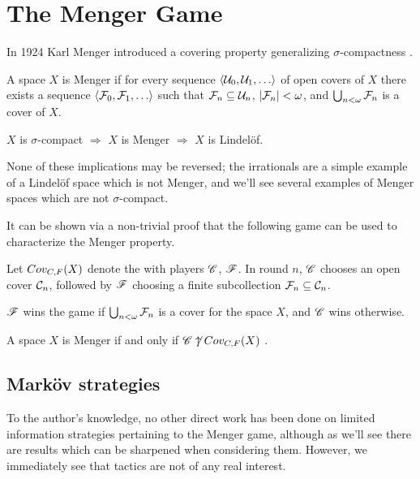 
\chapter{The Menger Game}

In 1924 Karl Menger introduced a covering property generalizing
$\sigma$-compactness \cite{custom31879423}.

\begin{defn}
  A space $X$ is Menger if for every sequence $\<\mc U_0,\mc U_1,\dots\>$
  of open covers of $X$ there exists a sequence
  $\<\mc F_0,\mc F_1,\dots\>$ such that $\mathcal{F}_n\subseteq \mathcal{U}_n$,
  $|\mathcal{F}_n|<\omega$, and $\bigcup_{n<\omega}\mathcal{F}_n$ is a cover of $X$.
\end{defn}

\begin{prop}
  $X$ is $\sigma$-compact
    $\Rightarrow$
  $X$ is Menger
    $\Rightarrow$
  $X$ is Lindel\"of.
\end{prop}

None of these implications may be reversed; the irrationals are a simple example
of a Lindel\"of space which is not Menger, and we'll see several examples of
Menger spaces which are not $\sigma$-compact.

It can be shown via a non-trivial
proof that the following game can be used to characterize the Menger property.

\begin{game}
  Let $Cov_{C,F}(X)$ denote the  with players $\mathscr{C}$, $\mathscr{F}$.
  In round $n$, $\mathscr{C}$ chooses an open cover $\mathcal{C}_n$, followed by $\mathscr{F}$
  choosing a finite subcollection $\mathcal{F}_n\subseteq \mathcal{C}_n$.

  $\mathscr{F}$ wins the game if $\bigcup_{n<\omega}\mathcal{F}_n$ is a cover for the space
  $X$, and $\mathscr{C}$ wins otherwise.
\end{game}

\begin{thm}
  A space $X$ is Menger if and only if $\mathscr{C}\not\uparrow Cov_{C,F}(X)$
  \cite{MR1544773}.
\end{thm}

\section{Mark\"ov strategies}

To the author's knowledge, no other direct work has been done on limited
information strategies pertaining to the Menger game, although as we'll see
there are results which can be sharpened when considering them.
However, we immediately see that tactics are not of any real interest.

